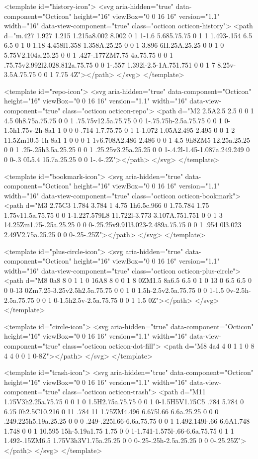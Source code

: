 <template id="history-icon">
  <svg aria-hidden="true" data-component="Octicon" height="16" viewBox="0 0 16 16" version="1.1" width="16" data-view-component="true" class="octicon octicon-history">
    <path d="m.427 1.927 1.215 1.215a8.002 8.002 0 1 1-1.6 5.685.75.75 0 1 1 1.493-.154 6.5 6.5 0 1 0 1.18-4.458l1.358 1.358A.25.25 0 0 1 3.896 6H.25A.25.25 0 0 1 0 5.75V2.104a.25.25 0 0 1 .427-.177ZM7.75 4a.75.75 0 0 1 .75.75v2.992l2.028.812a.75.75 0 0 1-.557 1.392l-2.5-1A.751.751 0 0 1 7 8.25v-3.5A.75.75 0 0 1 7.75 4Z"></path>
</svg>
</template>

<template id="repo-icon">
  <svg aria-hidden="true" data-component="Octicon" height="16" viewBox="0 0 16 16" version="1.1" width="16" data-view-component="true" class="octicon octicon-repo">
    <path d="M2 2.5A2.5 2.5 0 0 1 4.5 0h8.75a.75.75 0 0 1 .75.75v12.5a.75.75 0 0 1-.75.75h-2.5a.75.75 0 0 1 0-1.5h1.75v-2h-8a1 1 0 0 0-.714 1.7.75.75 0 1 1-1.072 1.05A2.495 2.495 0 0 1 2 11.5Zm10.5-1h-8a1 1 0 0 0-1 1v6.708A2.486 2.486 0 0 1 4.5 9h8ZM5 12.25a.25.25 0 0 1 .25-.25h3.5a.25.25 0 0 1 .25.25v3.25a.25.25 0 0 1-.4.2l-1.45-1.087a.249.249 0 0 0-.3 0L5.4 15.7a.25.25 0 0 1-.4-.2Z"></path>
</svg>
</template>

<template id="bookmark-icon">
  <svg aria-hidden="true" data-component="Octicon" height="16" viewBox="0 0 16 16" version="1.1" width="16" data-view-component="true" class="octicon octicon-bookmark">
    <path d="M3 2.75C3 1.784 3.784 1 4.75 1h6.5c.966 0 1.75.784 1.75 1.75v11.5a.75.75 0 0 1-1.227.579L8 11.722l-3.773 3.107A.751.751 0 0 1 3 14.25Zm1.75-.25a.25.25 0 0 0-.25.25v9.91l3.023-2.489a.75.75 0 0 1 .954 0l3.023 2.49V2.75a.25.25 0 0 0-.25-.25Z"></path>
</svg>
</template>

<template id="plus-circle-icon">
  <svg aria-hidden="true" data-component="Octicon" height="16" viewBox="0 0 16 16" version="1.1" width="16" data-view-component="true" class="octicon octicon-plus-circle">
    <path d="M8 0a8 8 0 1 1 0 16A8 8 0 0 1 8 0ZM1.5 8a6.5 6.5 0 1 0 13 0 6.5 6.5 0 0 0-13 0Zm7.25-3.25v2.5h2.5a.75.75 0 0 1 0 1.5h-2.5v2.5a.75.75 0 0 1-1.5 0v-2.5h-2.5a.75.75 0 0 1 0-1.5h2.5v-2.5a.75.75 0 0 1 1.5 0Z"></path>
</svg>
</template>

<template id="circle-icon">
  <svg aria-hidden="true" data-component="Octicon" height="16" viewBox="0 0 16 16" version="1.1" width="16" data-view-component="true" class="octicon octicon-dot-fill">
    <path d="M8 4a4 4 0 1 1 0 8 4 4 0 0 1 0-8Z"></path>
</svg>
</template>

<template id="trash-icon">
  <svg aria-hidden="true" data-component="Octicon" height="16" viewBox="0 0 16 16" version="1.1" width="16" data-view-component="true" class="octicon octicon-trash">
    <path d="M11 1.75V3h2.25a.75.75 0 0 1 0 1.5H2.75a.75.75 0 0 1 0-1.5H5V1.75C5 .784 5.784 0 6.75 0h2.5C10.216 0 11 .784 11 1.75ZM4.496 6.675l.66 6.6a.25.25 0 0 0 .249.225h5.19a.25.25 0 0 0 .249-.225l.66-6.6a.75.75 0 0 1 1.492.149l-.66 6.6A1.748 1.748 0 0 1 10.595 15h-5.19a1.75 1.75 0 0 1-1.741-1.575l-.66-6.6a.75.75 0 1 1 1.492-.15ZM6.5 1.75V3h3V1.75a.25.25 0 0 0-.25-.25h-2.5a.25.25 0 0 0-.25.25Z"></path>
</svg>
</template>

